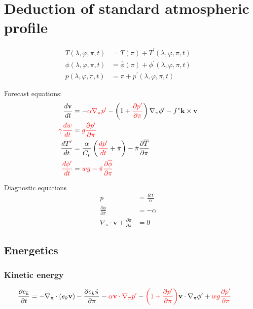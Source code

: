 \documentclass[12pt]{article}
\renewcommand{\d}[2]{\frac{d #1}{d #2}}
\newcommand{\dt}[1]{\d{#1}{t}}
\newcommand{\pd}[2]{\frac{\partial #1}{\partial #2}}
\newcommand{\pdt}[1]{\pd{#1}{t}}
\newcommand{\pdz}[1]{\pd{#1}{\pi}}
\renewcommand{\vec}[1]{\mathbf{#1}}
\newcommand{\x}{\lambda}
\newcommand{\y}{\varphi}
\newcommand{\grad}[2][\pi]{\nabla_{#1} #2}
\begin{document}
\section{Deduction of standard atmospheric profile}

\begin{align*}
      T\left(\x, \y, \pi, t\right) & = \overline{T}   \left(\pi\right) +    T^\prime\left(\x, \y, \pi, t\right) \\
   \phi\left(\x, \y, \pi, t\right) & = \overline{\phi}\left(\pi\right) + \phi^\prime\left(\x, \y, \pi, t\right) \\
      p\left(\x, \y, \pi, t\right) & =             \pi                 +    p^\prime\left(\x, \y, \pi, t\right)
\end{align*}

Forecast equations:
\begin{align*}
  \dt{\vec{v}} & = - {\color{red}\alpha \grad{p^\prime}} - \left(1 + {\color{red}\pd{p^\prime}{\pi}}\right) \grad{\phi^\prime} - f^* \vec{k} \times \vec{v} \\
  {\color{red}\gamma \dt{w}} & = {\color{red}g \pd{p^\prime}{\pi}} \\
  \dt{T^\prime} & = \frac{\alpha}{C_p} \left({\color{red}\dt{p^\prime}} + \dot{\pi}\right) - \dot{\pi} \pdz{\overline{T}} \\
  {\color{red}\dt{\phi^\prime}} & = {\color{red}w g - \dot{\pi} \pdz{\overline{\phi}}}
\end{align*}

Diagnostic equations
\begin{align*}
  p & = \frac{R T}{\alpha} \\
  \pd{\phi}{\pi} & = - \alpha \\
  \nabla_\pi \cdot \vec{v} + \pd{\dot{\pi}}{\pi} & = 0
\end{align*}

\subsection{Energetics}

\subsubsection{Kinetic energy}

\begin{align*}
  \pdt{e_k} & = - \nabla_\pi \cdot \left(e_k \vec{v}\right) - \pdz{e_k \dot{\pi}} - {\color{red}\alpha \vec{v} \cdot \nabla_\pi p^\prime} - {\color{red}\left(1 + \pd{p^\prime}{\pi}\right)} \vec{v} \cdot \nabla_\pi \phi^\prime + {\color{red}w g \pd{p^\prime}{\pi}}
\end{align*}
\end{document}
